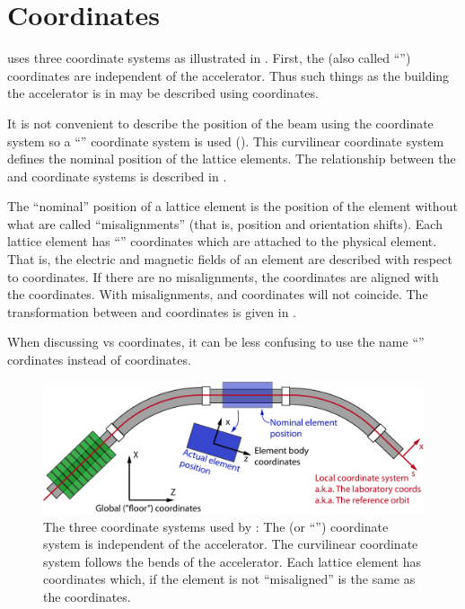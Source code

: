 \chapter{Coordinates}

\bmad uses three coordinate systems as illustrated in . First, the  (also
called ``'') coordinates are independent of the accelerator. Thus such things as the
building the accelerator is in may be described using  coordinates.

It is not convenient to describe the position of the beam using the  coordinate system so
a ``'' coordinate system is used ().  This curvilinear coordinate
system defines the nominal position of the lattice elements.  The relationship between the
 and  coordinate systems is described in .

The ``nominal'' position of a lattice element is the position of the element without what are called
``misalignments'' (that is, position and orientation shifts). Each lattice element has ``'' coordinates which are attached to the physical element. That is, the electric and magnetic
fields of an element are described with respect to  coordinates.  If there are no
misalignments, the  coordinates are aligned with the  coordinates. With
misalignments,  and  coordinates will not coincide.  The transformation
between  and  coordinates is given in .

When discussing  vs  coordinates, it can be less confusing to use the name
``'' cordinates instead of  coordinates.

\begin{figure}[!b]
  \centering
  \includegraphics[width=5in]{coordinates.pdf}
  \caption[The three coordinate system used by \bmad.]
{The three coordinate systems used by \bmad: The  (or ``'') coordinate system
is independent of the accelerator.  The  curvilinear coordinate system follows the bends
of the accelerator.  Each lattice element has  coordinates which, if the element is
not ``misaligned'' is the same as the  coordinates.}
  \label{f:coords}
\end{figure}


